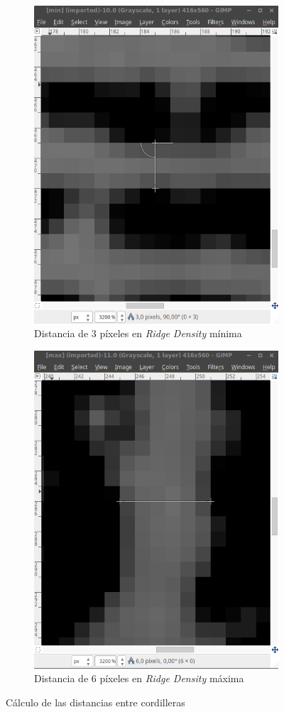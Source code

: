 \documentclass[10pt,a4paper]{article}
\begin{document}
\begin{figure}[h!]
\centering
\begin{subfigure}{.5\textwidth}
  \centering
  \includegraphics[width=.7\linewidth]{1.2/min.png}
  \caption{Distancia de 3 píxeles en \textit{Ridge Density} mínima}
  \label{fig:min_ridge}
\end{subfigure}%
\begin{subfigure}{.5\textwidth}
  \centering
  \includegraphics[width=.7\linewidth]{1.2/max.png}
  \caption{Distancia de 6 píxeles en \textit{Ridge Density} máxima}
  \label{fig:max_ridge}
\end{subfigure}
\caption{Cálculo de las distancias entre cordilleras}
\label{fig:measurements}
\end{figure}
\end{document}
